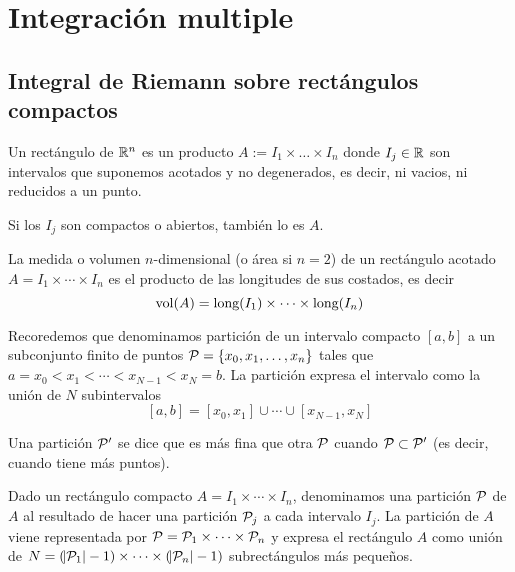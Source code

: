 \chapter{Integración multiple}

\section{Integral de Riemann sobre rectángulos compactos}

\begin{defi}
    Un rectángulo de $\mathbb{R}^n$ es un producto $A := I_1 \times \dots \times I_n$
    donde $I_j \in \mathbb{R}$ son intervalos que suponemos acotados y no degenerados,
    es decir, ni vacios, ni reducidos a un punto.
    
    Si los $I_j$ son compactos o abiertos, también lo es $A$.
\end{defi}

\begin{defi}
    La medida o volumen $n$-dimensional (o área si $n=2$) de un rectángulo
    acotado $A = I_1 \times \cdots \times I_n$ es el producto de las longitudes
    de sus costados, es decir
    \[
        \operatorname{vol}(A) = \text{long} (I_1) \times \dots \times \text{long} (I_n)
    \]
\end{defi}

\begin{obs}
    Recoredemos que denominamos partición de un intervalo compacto $[a,b]$ a un
    subconjunto finito de puntos $\mathcal{P}=\left\{x_0,x_1,\dots,x_n\right\}$ tales que
    $a = x_0 < x_1 < \cdots < x_{N-1} < x_N = b$. La partición expresa el intervalo
    como la unión de $N$ subintervalos
    \[
        [a,b] = [x_0,x_1] \cup \cdots \cup [x_{N-1},x_N]
    \]
\end{obs}
\begin{obs*}
    Una partición $\mathcal{P}^\prime$ se dice que es más fina que otra
    $\mathcal{P}$ cuando $\mathcal{P} \subset \mathcal{P}^\prime$ (es decir, cuando
    tiene más puntos).
\end{obs*}

\begin{defi}
    Dado un rectángulo compacto $A = I_1 \times \cdots \times I_n$, denominamos
    una partición $\mathcal{P}$ de $A$ al resultado de hacer una partición $\mathcal{P}_j$ a cada
    intervalo $I_j$.
    La partición de $A$ viene representada por $\mathcal{P} = \mathcal{P}_1 \times \cdots \times
    \mathcal{P}_n$ y expresa el rectángulo $A$ como unión de $N = (\abs{\mathcal{P}_1}-1) \times
    \cdots \times (\abs{\mathcal{P}_n}-1)$ subrectángulos más pequeños.
\end{defi}


